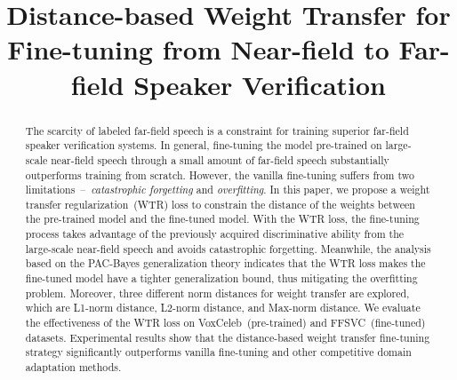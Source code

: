 \documentclass{article}
\title{Distance-based Weight Transfer for Fine-tuning from Near-field to Far-field Speaker Verification}
\begin{document}
\maketitle
 
\begin{abstract}
\iffalse
The scarcity of labeled far-field speech is a constraint for training superior far-field speaker verification systems. Fine-tuning the model pre-trained on large-scale near-field speech substantially outperforms training from scratch. However, the fine-tuning method suffers from two limitations~--~\textit{catastrophic forgetting} and~\textit{overfitting}. In this paper, we propose a weight transfer regularization~(WTR) loss to constrain the distance of the weights between the pre-trained model with large-scale near-field speech and the fine-tuned model through a small number of far-field speech. With the WTR loss, the fine-tuning process takes advantage of the previously acquired discriminative ability from the large-scale near-field speech without catastrophic forgetting. Meanwhile, we use the PAC-Bayes generalization theory to analyze the generalization bound of the fine-tuned model with the WTR loss. The analysis result indicates that the WTR term makes the fine-tuned model have a tighter generalization upper bound. Moreover, we explore three kinds of norm distance for weight transfer, which are L1-norm distance, L2-norm distance, and Max-norm distance. Finally, we evaluate the effectiveness of the WTR loss on VoxCeleb~(pre-trained dataset) and FFSVC~(fine-tuned dataset) datasets.
Experimental results show that the distance-based weight transfer fine-tuning strategy significantly outperforms vanilla fine-tuning and other competitive domain adaptation methods.
\fi
The scarcity of labeled far-field speech is a constraint for training superior far-field speaker verification systems. In general, fine-tuning the model pre-trained on large-scale near-field speech through a small amount of far-field speech substantially outperforms training from scratch. However, the vanilla fine-tuning suffers from two limitations~--~\textit{catastrophic forgetting} and \textit{overfitting}. In this paper, we propose a weight transfer regularization~(WTR) loss to constrain the distance of the weights between the pre-trained model and the fine-tuned model. With the WTR loss, the fine-tuning process takes advantage of the previously acquired discriminative ability from the large-scale near-field speech and avoids catastrophic forgetting.
Meanwhile, the analysis based on the PAC-Bayes generalization theory indicates that the WTR loss makes the fine-tuned model have a tighter generalization bound, thus mitigating the overfitting problem. Moreover, three different norm distances for weight transfer are explored, which are L1-norm distance, L2-norm distance, and Max-norm distance. We evaluate the effectiveness of the WTR loss on VoxCeleb~(pre-trained) and FFSVC~(fine-tuned) datasets. Experimental results show that the distance-based weight transfer fine-tuning strategy significantly outperforms vanilla fine-tuning and other competitive domain adaptation methods.
\end{abstract}
\end{document}
